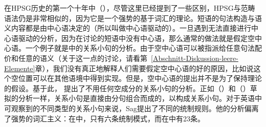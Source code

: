在HPSG历史的第一个十年中（\citealp*{ps,ps2,NNP94a-ed-not-crossreferenced}），尽管这里已经提到了一些区别，HPSG与范畴语法仍是非常相似的，因为它是一个强势的基于词汇的理论。短语的句法构造与语义内容都是由中心语决定的（所以叫做中心语驱动的）。一旦遇到无法直接进行中心语驱动的分析，因为在讨论的短语中没有中心语，那么通常的做法就是假定空中心语。一个例子就是\citet[Chapter~5]{ps2}中的关系小句的分析。由于空中心语可以被指派给任意句法配价和任意的语义（关于这一点的讨论，请看第~\ref{Abschnitt-Diskussion-leere-Elemente}章），我们没有真正地解释人们需要假定空中心语的好的原因，比如说这个空位置可以在其他语境中得到实现。但是，空中心语的提出并不是为了保持理论的假设。基于此， \citet{Sag97a}提出了不用任何空成分的关系小句的分析。正如（）和（）草拟的分析一样，关系小句是直接由分句组合而成的，以构成关系小句。对于英语中可观察到的不同类型的关系小句来说，Sag提出了不同的统制规则。他的分析偏离了强势的词汇主义：在中，只有六条统制模式，而在中有23条。

